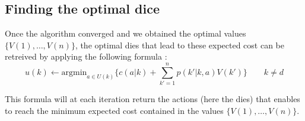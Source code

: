 
\subsection{Finding the optimal dice} %
\label{sub:choosing_the_optimal_dice}
Once the algorithm converged and we obtained the optimal 
values $\{V(1), \dots, V(n)\}$, the optimal dies that
lead to these expected cost can be retreived by applying
the following formula :
\[
  u(k) \leftarrow \text{argmin}_{a\in U(k)} \{c(a|k) 
  + \sum_{k'=1}^n p(k'|k,a)V(k') \} \qquad k \neq d
\]

This formula will at each iteration return the actions
(here the dies) that enables to reach the minimum
expected cost contained in the values $\{V(1), \dots, V(n)\}$.


